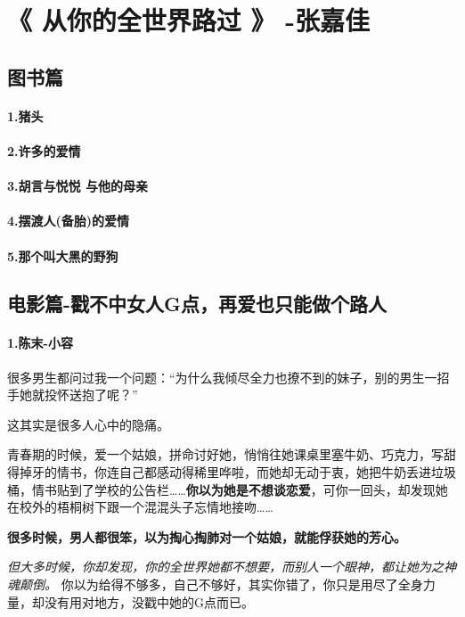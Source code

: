 \documentclass[UTF8,a4paper,8pt]{ctexart}
\begin{document}
 \newpage			
 \section{《 从你的全世界路过 》 -张嘉佳   }  	
 \subsection{图书篇}		
 \paragraph{1.猪头}
 \paragraph{2.许多的爱情}
 \paragraph{3.胡言与悦悦 与他的母亲}
 \paragraph{4.摆渡人(备胎)的爱情}
 \paragraph{5.那个叫大黑的野狗}
 
 \subsection{电影篇-戳不中女人G点，再爱也只能做个路人}
 \paragraph{1.陈末-小容}
 很多男生都问过我一个问题：“为什么我倾尽全力也撩不到的妹子，别的男生一招手她就投怀送抱了呢？”
 
 这其实是很多人心中的隐痛。
 
 青春期的时候，爱一个姑娘，拼命讨好她，悄悄往她课桌里塞牛奶、巧克力，写甜得掉牙的情书，你连自己都感动得稀里哗啦，而她却无动于衷，她把牛奶丢进垃圾桶，情书贴到了学校的公告栏……\textbf{你以为她是不想谈恋爱}，可你一回头，却发现她在校外的梧桐树下跟一个混混头子忘情地接吻……
 
 \textbf{很多时候，男人都很笨，以为掏心掏肺对一个姑娘，就能俘获她的芳心。}
 
 \textit{但大多时候，你却发现，你的全世界她都不想要，而别人一个眼神，都让她为之神魂颠倒。}
 你以为给得不够多，自己不够好，其实你错了，你只是用尽了全身力量，却没有用对地方，没戳中她的G点而已。
 
\end{document}
